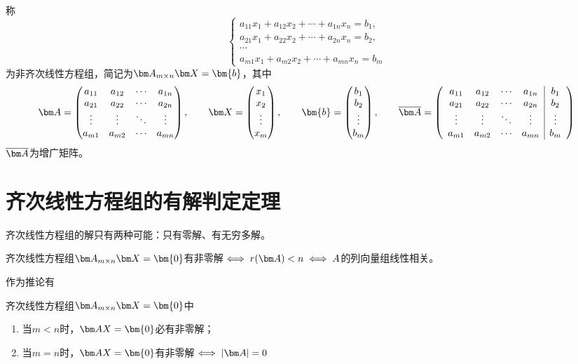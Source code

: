 称
\[
    \begin{cases}
        a_{11}x_1 + a_{12}x_2 + \cdots + a_{1n}x_n = b_1, \\
        a_{21}x_1 + a_{22}x_2 + \cdots + a_{2n}x_n = b_2, \\
        \cdots                                            \\
        a_{m1}x_1 + a_{m2}x_2 + \cdots + a_{mn}x_n = b_m
    \end{cases}
\]
为非齐次线性方程组，简记为$\mat{A}_{m\times n}\mat{X}=\bm{b}$，其中
\[
    \mat{A} =
    \begin{pmatrix}
        a_{11} & a_{12} & \cdots & a_{1n} \\
        a_{21} & a_{22} & \cdots & a_{2n} \\
        \vdots & \vdots & \ddots & \vdots \\
        a_{m1} & a_{m2} & \cdots & a_{mn}
    \end{pmatrix},
    \qquad
    \mat{X}=
    \begin{pmatrix}
        x_1 \\x_2\\\vdots\\x_m
    \end{pmatrix},
    \qquad
    \bm{b}=
    \begin{pmatrix}
        b_1 \\b_2\\\vdots\\b_m
    \end{pmatrix},
    \qquad
    \overline{\mat{A}}=
    \left(\begin{array}{cccc|c}
            a_{11} & a_{12} & \cdots & a_{1n} & b_1    \\
            a_{21} & a_{22} & \cdots & a_{2n} & b_2    \\
            \vdots & \vdots & \ddots & \vdots & \vdots \\
            a_{m1} & a_{m2} & \cdots & a_{mn} & b_m
        \end{array}\right)
\]
$\overline{\mat{A}}$为增广矩阵。

\section{齐次线性方程组的有解判定定理}
齐次线性方程组的解只有两种可能：只有零解、有无穷多解。
\begin{theorem}
    齐次线性方程组$\mat{A}_{m\times n}\mat{X}=\bm{0}$有非零解$\iff r(\mat{A})<n \iff A$的列向量组线性相关。
\end{theorem}
作为推论有
\begin{theorem}
    齐次线性方程组$\mat{A}_{m\times n}\mat{X}=\bm{0}$中
    \begin{enumerate}[(1)]
        \item 当$m<n$时，$\mat{AX}=\bm{0}$必有非零解；
        \item 当$m=n$时，$\mat{AX}=\bm{0}$有非零解$\iff |\mat{A}|=0$
    \end{enumerate}
\end{theorem}

